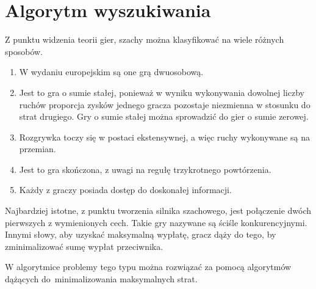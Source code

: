 \section{Algorytm wyszukiwania}
\label {sec:algorytm-wyszukiwania}


Z punktu widzenia teorii gier, szachy można klasyfikować na wiele różnych sposobów.
\begin{enumerate}
    \item W wydaniu europejskim są one grą dwuosobową.
    \item Jest to gra o sumie stałej, ponieważ w wyniku wykonywania dowolnej liczby ruchów proporcja zysków jednego gracza pozostaje niezmienna w stosunku do strat drugiego.
    Gry o sumie stałej można sprowadzić do gier o sumie zerowej.
    \item Rozgrywka toczy się w postaci ekstensywnej, a więc ruchy wykonywane są na przemian.
    \item Jest to gra skończona, z uwagi na regułę trzykrotnego powtórzenia.
    \item Każdy z graczy posiada dostęp do doskonałej informacji.
\end{enumerate}

Najbardziej istotne, z punktu tworzenia silnika szachowego, jest połączenie dwóch pierwszych z wymienionych cech.
Takie gry nazywane są ściśle konkurencyjnymi.
Innymi słowy, aby uzyskać maksymalną wypłatę, gracz dąży do tego, by zminimalizować sumę wypłat przeciwnika. \cite*{wstep-teoria-gier}

W algorytmice problemy tego typu można rozwiązać za pomocą algorytmów dążących do~minimalizowania maksymalnych strat.


